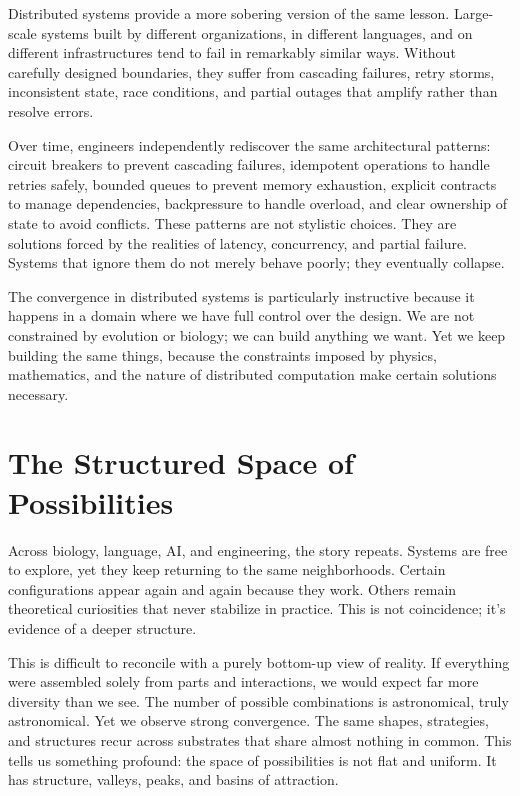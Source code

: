 \documentclass[
  openright]{book}
\begin{document}
Distributed systems provide a more sobering version of the same lesson.
Large-scale systems built by different organizations, in different
languages, and on different infrastructures tend to fail in remarkably
similar ways. Without carefully designed boundaries, they suffer from
cascading failures, retry storms, inconsistent state, race conditions,
and partial outages that amplify rather than resolve errors.

Over time, engineers independently rediscover the same architectural
patterns: circuit breakers to prevent cascading failures, idempotent
operations to handle retries safely, bounded queues to prevent memory
exhaustion, explicit contracts to manage dependencies, backpressure to
handle overload, and clear ownership of state to avoid conflicts. These
patterns are not stylistic choices. They are solutions forced by the
realities of latency, concurrency, and partial failure. Systems that
ignore them do not merely behave poorly; they eventually collapse.

The convergence in distributed systems is particularly instructive
because it happens in a domain where we have full control over the
design. We are not constrained by evolution or biology; we can build
anything we want. Yet we keep building the same things, because the
constraints imposed by physics, mathematics, and the nature of
distributed computation make certain solutions necessary.

\section{The Structured Space of
Possibilities}\label{the-structured-space-of-possibilities}

Across biology, language, AI, and engineering, the story repeats.
Systems are free to explore, yet they keep returning to the same
neighborhoods. Certain configurations appear again and again because
they work. Others remain theoretical curiosities that never stabilize in
practice. This is not coincidence; it's evidence of a deeper structure.

This is difficult to reconcile with a purely bottom-up view of reality.
If everything were assembled solely from parts and interactions, we
would expect far more diversity than we see. The number of possible
combinations is astronomical, truly astronomical. Yet we observe strong
convergence. The same shapes, strategies, and
structures recur across substrates that share almost nothing in common.
This tells us something profound: the space of possibilities is not flat
and uniform. It has structure, valleys, peaks, and basins of attraction.
\end{document}
